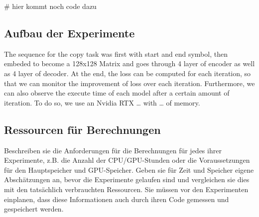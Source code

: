\documentclass[DIV=13,fontsize=11pt]{scrartcl}
\begin{document}
# hier kommt noch code dazu


\subsection{Aufbau der Experimente}
The sequence for the copy task was first with start and end symbol, then embeded to become a 128x128 Matrix and goes through 4 layer of encoder as well as 4 layer of decoder. At the end, the loss can be computed for each iteration, so that we can monitor the improvement of loss over each iteration. Furthermore, we can also observe the execute time of each model after a certain amount of iteration. To do so, we use an Nvidia RTX … with … of memory.

\subsection{Ressourcen für Berechnungen}
Beschreiben sie die Anforderungen für die Berechnungen für jedes ihrer Experimente, z.B. die Anzahl der CPU/GPU-Stunden oder die Voraussetzungen für den Hauptspeicher und GPU-Speicher. 
Geben sie für Zeit und Speicher eigene Abschätzungen an, bevor die Experimente gelaufen sind und vergleichen sie dies mit den tatsächlich verbrauchten Ressourcen.
Sie müssen vor den Experimenten einplanen, dass diese Informationen auch durch ihren Code gemessen und gespeichert werden.

\end{document}
